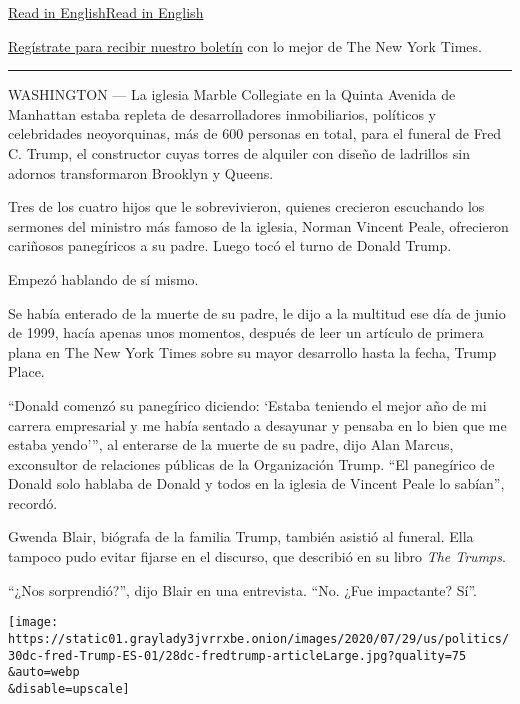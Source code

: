 \href{https://www.nytimes3xbfgragh.onion/2020/07/28/us/politics/donald-fred-trump.html}{Read
in
English}\href{https://www.nytimes3xbfgragh.onion/2020/07/28/us/politics/donald-fred-trump.html}{Read
in English}

\href{https://www.nytimes3xbfgragh.onion/newsletters/el-times}{Regístrate
para recibir nuestro boletín} con lo mejor de The New York Times.

\begin{center}\rule{0.5\linewidth}{\linethickness}\end{center}

WASHINGTON --- La iglesia Marble Collegiate en la Quinta Avenida de
Manhattan estaba repleta de desarrolladores inmobiliarios, políticos y
celebridades neoyorquinas, más de 600 personas en total, para el funeral
de Fred C. Trump, el constructor cuyas torres de alquiler con diseño de
ladrillos sin adornos transformaron Brooklyn y Queens.

Tres de los cuatro hijos que le sobrevivieron, quienes crecieron
escuchando los sermones del ministro más famoso de la iglesia, Norman
Vincent Peale, ofrecieron cariñosos panegíricos a su padre. Luego tocó
el turno de Donald Trump.

Empezó hablando de sí mismo.

Se había enterado de la muerte de su padre, le dijo a la multitud ese
día de junio de 1999, hacía apenas unos momentos, después de leer un
artículo de primera plana en The New York Times sobre su mayor
desarrollo hasta la fecha, Trump Place.

``Donald comenzó su panegírico diciendo: `Estaba teniendo el mejor año
de mi carrera empresarial y me había sentado a desayunar y pensaba en lo
bien que me estaba yendo''', al enterarse de la muerte de su padre, dijo
Alan Marcus, exconsultor de relaciones públicas de la Organización
Trump. ``El panegírico de Donald solo hablaba de Donald y todos en la
iglesia de Vincent Peale lo sabían'', recordó.

Gwenda Blair, biógrafa de la familia Trump, también asistió al funeral.
Ella tampoco pudo evitar fijarse en el discurso, que describió en su
libro \emph{The Trumps}.

``¿Nos sorprendió?'', dijo Blair en una entrevista. ``No. ¿Fue
impactante? Sí''.

\texttt{[image: https://static01.graylady3jvrrxbe.onion/images/2020/07/29/us/politics/30dc-fred-Trump-ES-01/28dc-fredtrump-articleLarge.jpg?quality=75\\\&auto=webp\\\&disable=upscale]}

